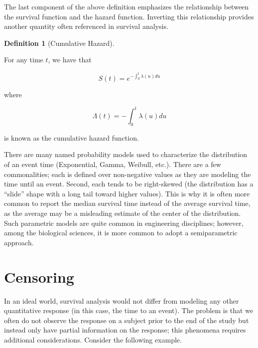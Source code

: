 \documentclass[
  letterpaper,
  DIV=11,
  numbers=noendperiod]{scrreprt}
\theoremstyle{definition}
\newtheorem{definition}{Definition}[chapter]
\theoremstyle{definition}
\theoremstyle{remark}
\begin{document}
The last component of the above definition emphasizes the relationship
between the survival function and the hazard function. Inverting this
relationship provides another quantity often referenced in survival
analysis.

\begin{definition}[Cumulative
Hazard]\protect\hypertarget{def-cumulative-hazard}{}\label{def-cumulative-hazard}

For any time \(t\), we have that

\[S(t) = e^{-\int_{0}^{t} \lambda(u) du}\]

where

\[\Lambda(t) = -\int_{0}^{t} \lambda(u) du\]

is known as the cumulative hazard function.

\end{definition}

There are many named probability models used to characterize the
distribution of an event time (Exponential, Gamma, Weibull, etc.). There
are a few commonalities; each is defined over non-negative values as
they are modeling the time until an event. Second, each tends to be
right-skewed (the distribution has a ``slide'' shape with a long tail
toward higher values). This is why it is often more common to report the
median survival time instead of the average survival time, as the
average may be a misleading estimate of the center of the distribution.
Such parametric models are quite common in engineering disciplines;
however, among the biological sciences, it is more common to adopt a
semiparametric approach.

\hypertarget{sec-surv-censoring}{%
\chapter{Censoring}\label{sec-surv-censoring}}

\providecommand{\norm}[1]{\left\lVert#1\right\rVert}
\providecommand{\abs}[1]{\left\lvert#1\right\rvert}
\providecommand{\dist}[1]{\stackrel{\text{#1}}{\sim}}
\providecommand{\ind}[1]{\mathbb{I}\left(#1\right)}
\providecommand{\bm}[1]{\mathbf{#1}}
\providecommand{\bs}[1]{\boldsymbol{#1}}
\providecommand{\Ell}{\mathcal{L}}
\providecommand{\indep}{\perp\negthickspace\negmedspace\perp}

In an ideal world, survival analysis would not differ from modeling any
other quantitative response (in this case, the time to an event). The
problem is that we often do not observe the response on a subject prior
to the end of the study but instead only have partial information on the
response; this phenomena requires additional considerations. Consider
the following example.
\end{document}
